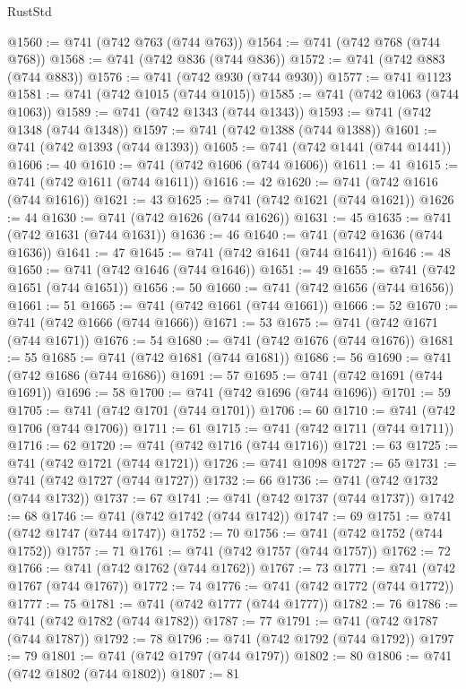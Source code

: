 \begin{lexlean}{RustStd}
\begin{coremodule}
@1560 := @741 (@742 @763 (@744 @763))
@1564 := @741 (@742 @768 (@744 @768))
@1568 := @741 (@742 @836 (@744 @836))
@1572 := @741 (@742 @883 (@744 @883))
@1576 := @741 (@742 @930 (@744 @930))
@1577 := @741 @1123
@1581 := @741 (@742 @1015 (@744 @1015))
@1585 := @741 (@742 @1063 (@744 @1063))
@1589 := @741 (@742 @1343 (@744 @1343))
@1593 := @741 (@742 @1348 (@744 @1348))
@1597 := @741 (@742 @1388 (@744 @1388))
@1601 := @741 (@742 @1393 (@744 @1393))
@1605 := @741 (@742 @1441 (@744 @1441))
@1606 := 40
@1610 := @741 (@742 @1606 (@744 @1606))
@1611 := 41
@1615 := @741 (@742 @1611 (@744 @1611))
@1616 := 42
@1620 := @741 (@742 @1616 (@744 @1616))
@1621 := 43
@1625 := @741 (@742 @1621 (@744 @1621))
@1626 := 44
@1630 := @741 (@742 @1626 (@744 @1626))
@1631 := 45
@1635 := @741 (@742 @1631 (@744 @1631))
@1636 := 46
@1640 := @741 (@742 @1636 (@744 @1636))
@1641 := 47
@1645 := @741 (@742 @1641 (@744 @1641))
@1646 := 48
@1650 := @741 (@742 @1646 (@744 @1646))
@1651 := 49
@1655 := @741 (@742 @1651 (@744 @1651))
@1656 := 50
@1660 := @741 (@742 @1656 (@744 @1656))
@1661 := 51
@1665 := @741 (@742 @1661 (@744 @1661))
@1666 := 52
@1670 := @741 (@742 @1666 (@744 @1666))
@1671 := 53
@1675 := @741 (@742 @1671 (@744 @1671))
@1676 := 54
@1680 := @741 (@742 @1676 (@744 @1676))
@1681 := 55
@1685 := @741 (@742 @1681 (@744 @1681))
@1686 := 56
@1690 := @741 (@742 @1686 (@744 @1686))
@1691 := 57
@1695 := @741 (@742 @1691 (@744 @1691))
@1696 := 58
@1700 := @741 (@742 @1696 (@744 @1696))
@1701 := 59
@1705 := @741 (@742 @1701 (@744 @1701))
@1706 := 60
@1710 := @741 (@742 @1706 (@744 @1706))
@1711 := 61
@1715 := @741 (@742 @1711 (@744 @1711))
@1716 := 62
@1720 := @741 (@742 @1716 (@744 @1716))
@1721 := 63
@1725 := @741 (@742 @1721 (@744 @1721))
@1726 := @741 @1098
@1727 := 65
@1731 := @741 (@742 @1727 (@744 @1727))
@1732 := 66
@1736 := @741 (@742 @1732 (@744 @1732))
@1737 := 67
@1741 := @741 (@742 @1737 (@744 @1737))
@1742 := 68
@1746 := @741 (@742 @1742 (@744 @1742))
@1747 := 69
@1751 := @741 (@742 @1747 (@744 @1747))
@1752 := 70
@1756 := @741 (@742 @1752 (@744 @1752))
@1757 := 71
@1761 := @741 (@742 @1757 (@744 @1757))
@1762 := 72
@1766 := @741 (@742 @1762 (@744 @1762))
@1767 := 73
@1771 := @741 (@742 @1767 (@744 @1767))
@1772 := 74
@1776 := @741 (@742 @1772 (@744 @1772))
@1777 := 75
@1781 := @741 (@742 @1777 (@744 @1777))
@1782 := 76
@1786 := @741 (@742 @1782 (@744 @1782))
@1787 := 77
@1791 := @741 (@742 @1787 (@744 @1787))
@1792 := 78
@1796 := @741 (@742 @1792 (@744 @1792))
@1797 := 79
@1801 := @741 (@742 @1797 (@744 @1797))
@1802 := 80
@1806 := @741 (@742 @1802 (@744 @1802))
@1807 := 81

\end{coremodule}
\end{lexlean}
